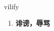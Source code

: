 
\begin{frame}
{\huge vilify}
\begin{center}
\begin{enumerate}\Large
  \item \textbf{诽谤，辱骂}
\end{enumerate}
\end{center}
\end{frame}
